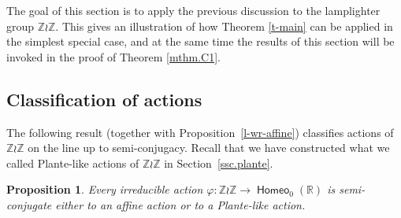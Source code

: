 \documentclass[JEP,XML,SOM,Unicode,NoFloatCountersInSection,published]{cedram}
\newtheorem{prop}[thm]{Proposition}
\theoremstyle{definition}
\DeclareMathOperator{\homeo}{\mathsf{Homeo}}
\newcommand{\R}{\mathbb{R}}
\newcommand{\Z}{\mathbb Z}
\begin{document}
The goal of this section is to apply the previous discussion to the lamplighter group $\Z \wr \Z$. This gives an illustration of how Theorem \ref{t-main} can be applied in the simplest special case, and at the same time the results of this section will be invoked in the proof of Theorem \ref{mthm.C1}.

\subsection{Classification of actions} The following result (together with Proposition~\ref{l-wr-affine}) classifies actions of $\Z \wr \Z$ on the line up to semi-conjugacy. Recall that we have constructed what we called Plante-like actions of $\Z\wr\Z$ in Section~\ref{ssc.plante}.

\begin{prop}\label{p-ZwrZ}
Every irreducible action $\varphi\colon \Z\wr \Z \to \homeo_0(\R)$ is semi-conjugate either to an affine action or to a Plante-like action.
\end{prop}
\end{document}
